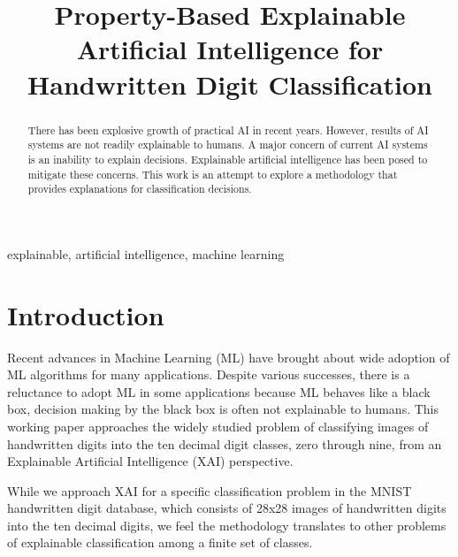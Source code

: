 \documentclass[conference]{IEEEtran}
\begin{document}
\title{Property-Based Explainable Artificial Intelligence for Handwritten Digit Classification}

\author{
}

\maketitle

\begin{abstract}
There has been explosive growth of practical AI in recent years.
However, results of AI systems are not readily explainable to humans.
A major concern of current AI systems is an inability to explain decisions.
Explainable artificial intelligence has been posed to mitigate these concerns.
This work is an attempt to explore a methodology that provides explanations
for classification decisions.
\end{abstract}

\begin{IEEEkeywords}
explainable, artificial intelligence, machine learning
\end{IEEEkeywords}

\section{Introduction}

Recent advances in Machine Learning (ML) have brought about wide adoption of ML algorithms for many applications.  Despite various successes, there is a reluctance to adopt ML in some applications because ML behaves like a black box, decision making by the black box is often not explainable to humans.  This working paper approaches the widely studied problem of classifying images of handwritten digits into the ten decimal digit classes, zero through nine, from an Explainable Artificial Intelligence (XAI) perspective.

While we approach XAI for a specific classification problem in the MNIST handwritten digit database, which consists of 28x28 images of handwritten digits into the ten decimal digits, we feel the methodology translates to other problems of explainable classification among a finite set of classes.
\end{document}
